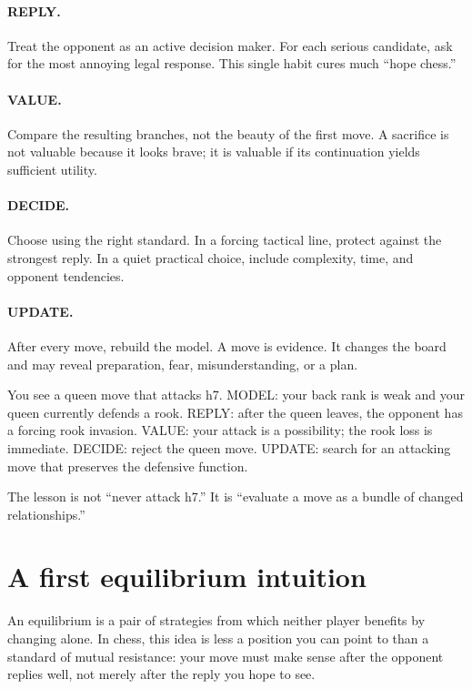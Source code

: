 \paragraph{REPLY.} Treat the opponent as an active decision maker. For each serious candidate, ask for the most annoying legal response. This single habit cures much ``hope chess.''

\paragraph{VALUE.} Compare the resulting branches, not the beauty of the first move. A sacrifice is not valuable because it looks brave; it is valuable if its continuation yields sufficient utility.

\paragraph{DECIDE.} Choose using the right standard. In a forcing tactical line, protect against the strongest reply. In a quiet practical choice, include complexity, time, and opponent tendencies.

\paragraph{UPDATE.} After every move, rebuild the model. A move is evidence. It changes the board and may reveal preparation, fear, misunderstanding, or a plan.

\begin{workedbox}[title={Worked example: the attractive move}]
You see a queen move that attacks h7. MODEL: your back rank is weak and your queen currently defends a rook. REPLY: after the queen leaves, the opponent has a forcing rook invasion. VALUE: your attack is a possibility; the rook loss is immediate. DECIDE: reject the queen move. UPDATE: search for an attacking move that preserves the defensive function.

The lesson is not ``never attack h7.'' It is ``evaluate a move as a bundle of changed relationships.''
\end{workedbox}

\section{A first equilibrium intuition}
An equilibrium is a pair of strategies from which neither player benefits by changing alone. In chess, this idea is less a position you can point to than a standard of mutual resistance: your move must make sense after the opponent replies well, not merely after the reply you hope to see.

